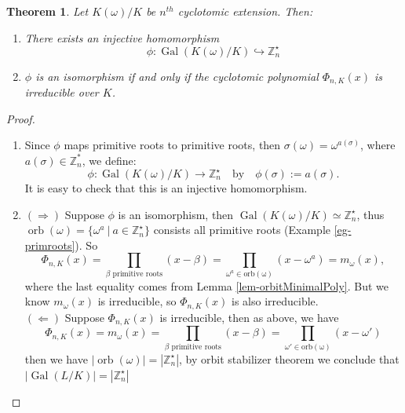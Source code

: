 \documentclass[11pt]{book}
\newtheorem{theorem}{Theorem}[section]
\begin{document}
\begin{theorem}
Let $ K(\omega)/K $ be $n^{th}$ cyclotomic extension. Then:
\begin{enumerate}
    \item There exists an injective homomorphism
    $$
    \phi: \operatorname{Gal}(K(\omega)/K) \hookrightarrow \mathbb{Z}_n^\star
    $$
    
    \item $\phi$ is an isomorphism if and only if the cyclotomic polynomial $\Phi_{n,K}(x)$ is irreducible over $K$.
\end{enumerate}
\end{theorem}
\begin{proof}
    \begin{enumerate}
        \item Since $\phi$ maps primitive roots to primitive roots, then $\sigma(\omega)=\omega^{a(\sigma)}$, where $a(\sigma)\in \mathbb{Z}_n^*$, we define: $$\phi:\operatorname{Gal}(K(\omega)/K) \rightarrow \mathbb{Z}_n^\star \quad \text{by} \quad \phi(\sigma):=a(\sigma).$$
        It is easy to check that this is an injective homomorphism.
        \item $(\Rightarrow)$ Suppose $\phi$ is an isomorphism, then $ \operatorname{Gal}(K(\omega)/K) \simeq \mathbb{Z}_n^\star $, thus $\operatorname{orb}(\omega)=\{\omega^{a} \ |\ a \in \mathbb{Z}_n^\star \}$ consists all primitive roots (Example \ref{eg-primroots}). So
        $$\Phi_{n,K}(x)=\prod_{\beta \text{ primitive roots}} (x-\beta) = \prod_{\omega^a \in \operatorname{orb(\omega)}}(x-\omega^a)=m_\omega(x),$$
        where the last equality comes from Lemma \ref{lem-orbitMinimalPoly}. But we know $m_\omega  (x) $ is irreducible, so $\Phi_{n,K}(x)$ is also irreducible.
        \\
        $(\Leftarrow)$ Suppose $\Phi_{n,K}(x) $ is irreducible, then as above, we have 
        $$\Phi_{n,K}(x)=m_\omega(x)=\prod_{\beta \text{ primitive  roots}}(x-\beta) =  \prod_{\omega' \in \operatorname{orb(\omega)}}(x-\omega')$$
        then we have $|\operatorname{orb}(\omega)|=|\mathbb{Z}_n^\star|$, by orbit stabilizer theorem we conclude that $|\operatorname{Gal}(L/K)|=|\mathbb{Z}_n^\star|$
    \end{enumerate}
\end{proof}
\end{document}
